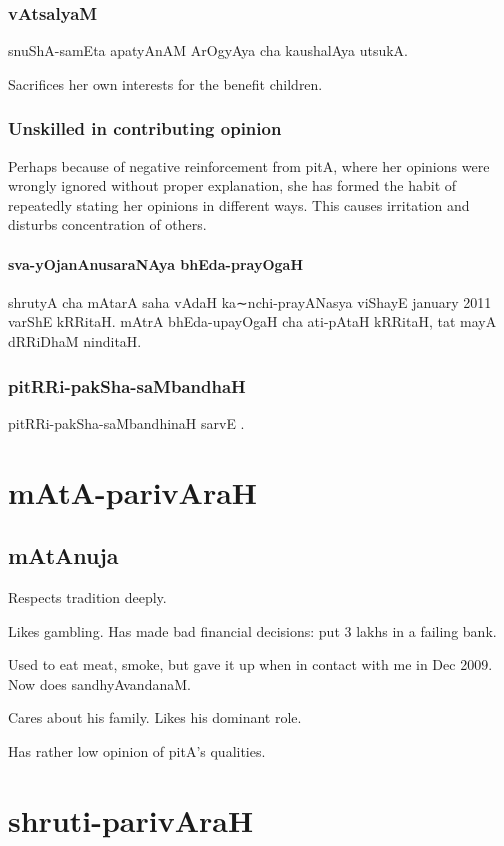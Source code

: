 \documentclass[oneside, article]{memoir}
\begin{document}
\section{vAtsalyaM}
snuShA-samEta apatyAnAM ArOgyAya cha kaushalAya utsukA.

Sacrifices her own interests for the benefit children.

\section{Unskilled in contributing opinion}
Perhaps because of negative reinforcement from pitA, where her opinions were wrongly ignored without proper explanation, she has formed the habit of repeatedly stating her opinions in different ways. This causes irritation and disturbs concentration of others.

\subsection{sva-yOjanAnusaraNAya bhEda-prayOgaH}
shrutyA cha mAtarA saha vAdaH ka∼nchi-prayANasya viShayE january 2011 varShE kRRitaH. mAtrA bhEda-upayOgaH cha ati-pAtaH kRRitaH, tat mayA dRRiDhaM ninditaH.

\section{pitRRi-pakSha-saMbandhaH}
pitRRi-pakSha-saMbandhinaH sarvE .

\part{mAtA-parivAraH}
\chapter{mAtAnuja}
Respects tradition deeply.

Likes gambling. Has made bad financial decisions: put 3 lakhs in a failing bank.

Used to eat meat, smoke, but gave it up when in contact with me in Dec 2009. Now does sandhyAvandanaM.

Cares about his family. Likes his dominant role.

Has rather low opinion of pitA's qualities.


\part{shruti-parivAraH}
\end{document}
